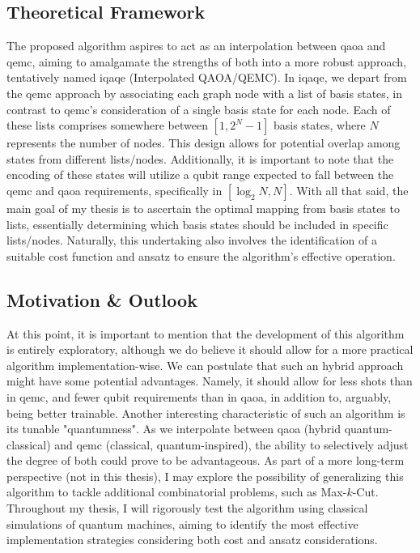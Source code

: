 \subsection{Theoretical Framework}
\label{subsection:iQAQE Theoretical Framework}
The proposed algorithm aspires to act as an interpolation between \acrshort{qaoa} and \acrshort{qemc}, aiming to amalgamate the strengths of both into a more robust approach, tentatively named \acrshort{iqaqe} (Interpolated QAOA/QEMC). In \acrshort{iqaqe}, we depart from the \acrshort{qemc} approach by associating each graph node with a list of basis states, in contrast to \acrshort{qemc}'s consideration of a single basis state for each node. Each of these lists comprises somewhere between $\left[1, 2^{N}-1\right]$ basis states, where $N$ represents the number of nodes. This design allows for potential overlap among states from different lists/nodes. Additionally, it is important to note that the encoding of these states will utilize a qubit range expected to fall between the \acrshort{qemc} and \acrshort{qaoa} requirements, specifically in $[\log_2{N}, N]$. With all that said, the main goal of my thesis is to ascertain the optimal mapping from basis states to lists, essentially determining which basis states should be included in specific lists/nodes. Naturally, this undertaking also involves the identification of a suitable cost function and ansatz to ensure the algorithm's effective operation.

\subsection{Motivation \& Outlook}
\label{subsection:iQAQE Motivation}
At this point, it is important to mention that the development of this algorithm is entirely exploratory, although we do believe it should allow for a more practical algorithm implementation-wise. We can postulate that such an hybrid approach might have some potential advantages. Namely, it should allow for less shots than in \acrshort{qemc}, and fewer qubit requirements than in \acrshort{qaoa}, in addition to, arguably, being better trainable. Another interesting characteristic of such an algorithm is its tunable "quantumness". As we interpolate between \acrshort{qaoa} (hybrid quantum-classical) and \acrshort{qemc} (classical, quantum-inspired), the ability to selectively adjust the degree of both could prove to be advantageous. As part of a more long-term perspective (not in this thesis), I may explore the possibility of generalizing this algorithm to tackle additional combinatorial problems, such as Max-$k$-Cut. Throughout my thesis, I will rigorously test the algorithm using classical simulations of quantum machines, aiming to identify the most effective implementation strategies considering both cost and ansatz considerations.

